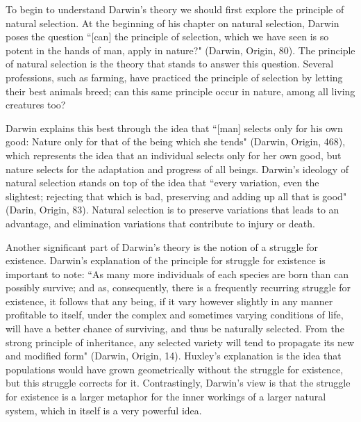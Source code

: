 \documentclass[11pt, oneside]{article}
\begin{document}
\par To begin to understand Darwin's theory we should first explore the principle of natural selection. At the beginning of his chapter on natural selection, Darwin poses the question ``[can] the principle of selection, which we have seen is so potent in the hands of man, apply in nature?" (Darwin, Origin, 80). The principle of natural selection is the theory that stands to answer this question. Several professions, such as farming, have practiced the principle of selection by letting their best animals breed; can this same principle occur in nature, among all living creatures too? 

\par Darwin explains this best through the idea that ``[man] selects only for his own good: Nature only for that of the being which she tends" (Darwin, Origin, 468), which represents the idea that an individual selects only for her own good, but nature selects for the adaptation and progress of all beings. Darwin's ideology of natural selection stands on top of the idea that ``every variation, even the slightest; rejecting that which is bad, preserving and adding up all that is good" (Darin, Origin, 83). Natural selection is to preserve variations that leads to an advantage, and elimination variations that contribute to injury or death. 

\par Another significant part of Darwin's theory is the notion of a struggle for existence. Darwin's explanation of the principle for struggle for existence is important to note: ``As many more individuals of each species are born than can possibly survive; and as, consequently, there is a frequently recurring struggle for existence, it follows that any being, if it vary however slightly in any manner profitable to itself, under the complex and sometimes varying conditions of life, will have a better chance of surviving, and thus be naturally selected. From the strong principle of inheritance, any selected variety will tend to propagate its new and modified form" (Darwin, Origin, 14). Huxley's explanation is the idea that populations would have grown geometrically without the struggle for existence, but this struggle corrects for it. Contrastingly, Darwin's view is that the struggle for existence is a larger metaphor for the inner workings of a larger natural system, which in itself is a very powerful idea.

\end{document}
